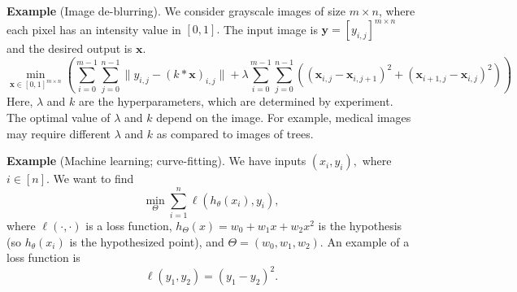 \documentclass[twoside]{article}
\begin{document}
\textbf{Example} (Image de-blurring). We consider grayscale images of size $m
\times n$, where each pixel has an intensity value in $[0, 1].$ The input image
is $\mathbf{y} = [y_{i, j}]^{m \times n}$ and the desired output is
$\mathbf{x}.$
\[
    \min_{\mathbf{x} \in [0, 1]^{m \times n}}
    \left(
    \sum_{i = 0}^{m - 1} \sum_{j = 0}^{n - 1} \|y_{i, j} - (k * \mathbf{x})_{i, j}\| +
    \lambda \sum_{i = 0}^{m - 1} \sum_{j = 0}^{n - 1} ((\mathbf{x}_{i, j} - \mathbf{x}_{i, j + 1})^2 + (\mathbf{x}_{i + 1, j} - \mathbf{x}_{i, j})^2)
    \right)
\] Here, $\lambda$ and $k$ are the hyperparameters, which are determined by
experiment. The optimal value of $\lambda$ and $k$ depend on the image. For
example, medical images may require different $\lambda$ and $k$ as compared to
images of trees.


\textbf{Example} (Machine learning; curve-fitting). We have inputs $(x_i, y_i),$
where $i \in [n].$ We want to find \[
    \min_\Theta \sum_{i = 1}^{n} \ell(h_\theta(x_i), y_i),
\] where $\ell(\cdot, \cdot)$ is a loss function, $h_\Theta(x) = w_0 + w_1 x +
w_2 x^2$ is the hypothesis (so $h_\theta(x_i)$ is the hypothesized point), and
$\Theta = (w_0, w_1, w_2)$. An example of a loss function is \[
    \ell(y_1, y_2) = (y_1 - y_2)^2.
\] 
\end{document}
